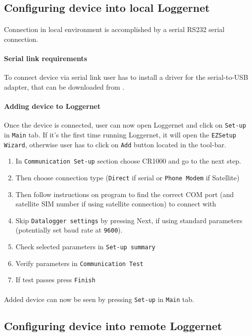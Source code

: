 \subsection{Configuring device into local Loggernet}
\paragraph{}
Connection in local environment is accomplished by a serial RS232 serial connection.
\paragraph{Serial link requirements}
To connect device via serial link user has to install a driver for the serial-to-USB adapter, that can be downloaded from \cite{prol1}.
\paragraph{Adding device to Loggernet}
Once the device is connected, user can now open Loggernet and click on {\tt Set-up} in {\tt Main} tab. If it's the first time running Loggernet, it will open the {\tt EZSetup Wizard}, 
otherwise user has to click on {\tt Add} button located in the tool-bar.
\begin{enumerate}
	\item In {\tt Communication Set-up} section choose CR1000 and go to the next step.
	\item Then choose connection type ({\tt Direct} if serial or {\tt Phone Modem} if Satellite)
	\item Then follow instructions on program to find the correct COM port (and satellite SIM number if using satellite connection) to connect with
	\item Skip {\tt Datalogger settings}  by pressing Next, if using standard parameters (potentially set baud rate at {\tt 9600}).
	\item Check selected parameters in {\tt Set-up summary}
	\item Verify parameters in {\tt Communication Test}
	\item If test passes press {\tt Finish}
\end{enumerate}
\paragraph{}
Added device can now be seen by pressing {\tt Set-up} in {\tt Main} tab.

\subsection{Configuring device into remote Loggernet}
